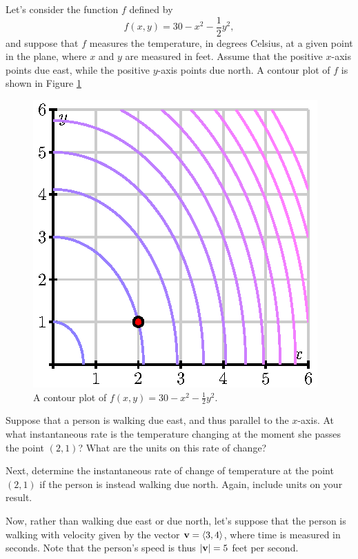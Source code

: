 \begin{pa} \label{PA:10.6} 
  Let's consider the function $f$ defined by 
  $$
  f(x,y) = 30 - x^2 - \frac 12 y^2,
  $$
  and suppose that $f$ measures the temperature, in degrees Celsius, at a given point in the plane, where $x$ and $y$ are measured in feet.  Assume that the positive $x$-axis points due east, while the positive $y$-axis points due north.  A contour plot of $f$ is shown in Figure \ref{F:10.6.preview.1}

  \begin{figure}[ht]
    \begin{center}
      \includegraphics{figures/fig_10_6_preview_1.eps}
    \end{center}
    \caption{A contour plot of $f(x,y) = 30-x^2-\frac12 y^2$.}
    \label{F:10.6.preview.1}
  \end{figure}
  \ba
  	\item Suppose that a person is walking due east, and thus parallel to the $x$-axis.  At what instantaneous rate is the temperature changing at the moment she passes the point $(2,1)$?  What are the units on this rate of change?
	\item Next, determine the instantaneous rate of change of temperature at the point $(2,1)$ if the person is instead walking due north.  Again, include units on your result.
	\item Now, rather than walking due east or due north, let's suppose that the person is walking with velocity given by the vector $\mathbf{v} = \langle 3, 4 \rangle$, where time is measured in seconds.  Note that the person's speed is thus $| \mathbf{v} | = 5$ feet per second.
	

\end{pa}
